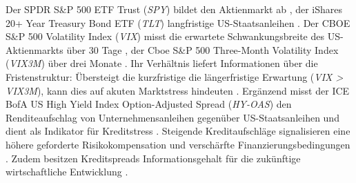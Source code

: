 Der SPDR S\&P 500 ETF Trust (\textit{SPY}) bildet den Aktienmarkt ab \cite{noauthor_spy:_nodate}, der iShares 20+ Year Treasury Bond ETF (\textit{TLT}) langfristige US-Staatsanleihen \cite{noauthor_ishares_nodate}. Der CBOE S\&P 500 Volatility Index (\textit{VIX}) misst die erwartete Schwankungsbreite des US-Aktienmarkts über 30 Tage \cite{noauthor_vix_nodate}, der Cboe S\&P 500 Three-Month Volatility Index (\textit{VIX3M}) über drei Monate \cite{noauthor_cboe_nodate}. Ihr Verhältnis liefert Informationen über die Fristenstruktur: Übersteigt die kurzfristige die längerfristige Erwartung (\textit{VIX > VIX3M}), kann dies auf akuten Marktstress hindeuten \cite[2467]{johnson_risk_2015}. Ergänzend misst der ICE BofA US High Yield Index Option-Adjusted Spread (\textit{HY-OAS}) den Renditeaufschlag von Unternehmensanleihen gegenüber US-Staatsanleihen und dient als Indikator für Kreditstress \cite{ice_bofa}. Steigende Kreditaufschläge signalisieren eine höhere geforderte Risikokompensation und verschärfte Finanzierungsbedingungen \cite[1692–1693]{gilchrist_credit_2012}. Zudem besitzen Kreditspreads Informationsgehalt für die zukünftige wirtschaftliche Entwicklung \cite[1698–1699]{gilchrist_credit_2012}.

